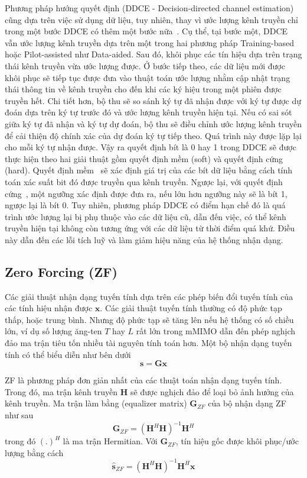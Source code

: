 Phương pháp hướng quyết định (DDCE - Decision-directed channel estimation) cũng dựa trên việc sử dụng dữ liệu, tuy nhiên, thay vì ước lượng kênh truyền chỉ trong một bước DDCE có thêm một bước nữa~\cite{vilas2022}. Cụ thể, tại bước một, DDCE vẫn ước lượng kênh truyền dựa trên một trong hai phương pháp Training-based hoặc Pilot-assisted như Data-aided. Sau đó, khôi phục các tín hiệu dựa trên trạng thái kênh truyền vừa ước lượng được. Ở bước tiếp theo, các dữ liệu mới được khôi phục sẽ tiếp tục được đưa vào thuật toán ước lượng nhằm cập nhật trạng thái thông tin về kênh truyền cho đến khi các ký hiệu trong một phiên được truyền hết. Chi tiết hơn, bộ thu sẽ so sánh ký tự đã nhận được với ký tự được dự đoán dựa trên ký tự trước đó và ước lượng kênh truyền hiện tại. Nếu có sai sót giữa ký tự đã nhận và ký tự dự đoán, bộ thu sẽ điều chỉnh ước lượng kênh truyền để cải thiện độ chính xác của dự đoán ký tự tiếp theo. Quá trình này được lặp lại cho mỗi ký tự nhận được. Vậy ra quyết định bít là 0 hay 1 trong DDCE sẽ được thực hiện theo hai giải thuật gồm quyết định mềm (soft) và quyết định cứng (hard). Quyết định mềm~\cite{Park2015} sẽ xác định giá trị của các bít dữ liệu bằng cách tính toán xác suất bit đó được truyền qua kênh truyền. Ngược lại, với quyết định cứng~\cite{Kai2005}, một ngưỡng xác định được đưa ra, nếu lớn hơn ngưỡng này sẽ là bít 1, ngược lại là bít 0. Tuy nhiên, phương pháp DDCE có điểm hạn chế đó là quá trình ước lượng lại bị phụ thuộc vào các dữ liệu cũ, dẫn đến việc, có thể kênh truyền hiện tại không còn tương ứng với các dữ liệu từ thời điểm quá khứ. Điều này dẫn đến các lỗi tích luỹ và làm giảm hiệu năng của hệ thống nhận dạng.

\subsection{Zero Forcing (ZF)} \label{sec:zf}

Các giải thuật nhận dạng tuyến tính dựa trên các phép biến đổi tuyến tính của các tính hiệu nhận được $\mathbf{x}$. Các giải thuật tuyến tính thường có độ phức tạp thấp, hoặc trung bình. Nhưng độ phức tạp sẽ tăng lên nếu hệ thống có số chiều lớn, ví dụ số lượng ăng-ten $T$ hay $L$ rất lớn trong mMIMO dẫn đến phép nghịch đảo ma trận tiêu tốn nhiều tài nguyên tính toán hơn. Một bộ nhận dạng tuyến tính có thể biểu diễn như bên dưới
\begin{equation}
    \mathbf{s} = \mathbf{G} \mathbf{x}
\end{equation}

ZF là phương pháp đơn giản nhất của các thuật toán nhận dạng tuyến tính. Trong đó, ma trận kênh truyền $\mathbf{H}$ sẽ được nghịch đảo để loại bỏ ảnh hưởng của kênh truyền. Ma trận làm bằng (equalizer matrix) $\mathbf{G}_{ZF}$ của bộ nhận dạng ZF như sau
\begin{equation}
    \mathbf{G}_{ZF}=\left(\mathbf{H}^H \mathbf{H}\right)^{-1} \mathbf{H}^H
\end{equation}
trong đó $(.)^H$ là ma trận Hermitian. Với $\mathbf{G}_{ZF}$, tín hiệu gốc được khôi phục/ước lượng bằng cách
\begin{equation}
    \hat{\mathbf{s}}_{ZF}=\left(\mathbf{H}^H \mathbf{H}\right)^{-1} \mathbf{H}^H \mathbf{x}
\end{equation}

